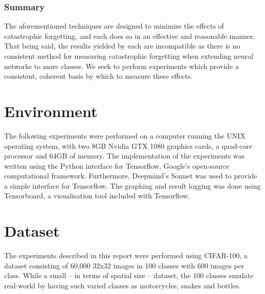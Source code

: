 \documentclass{report}
\begin{document}
	\subsubsection{Summary}
	The aforementioned techniques are designed to minimise the effects of catastrophic forgetting, and each does so in an effective and reasonable manner. That being said, the results yielded by each are incompatible as there is no consistent method for measuring catastrophic forgetting when extending neural networks to more classes. We seek to perform experiments which provide a consistent, coherent basis by which to measure these effects. \par
	

	\section{Environment}
	The following experiments were performed on a computer running the UNIX operating system, with two 8GB Nvidia GTX 1080 graphics cards, a quad-core processor and 64GB of memory. The implementation of the experiments was written using the Python interface for Tensorflow\parencite{tensorflow}, Google's open-source computational framework. Furthermore, Deepmind's Sonnet\parencite{sonnet} was used to provide a simple interface for Tensorflow. The graphing and result logging was done using Tensorboard, a visualisation tool included with Tensorflow. \par
	
	\section{Dataset}
	The experiments described in this report were performed using CIFAR-100\parencite{cifar100}, a dataset consisting of 60,000 32x32 images in 100 classes with 600 images per class. While a small -- in terms of spatial size -- dataset, the 100 classes emulate real-world by having such varied classes as motorcycles, snakes and bottles. \par
	
\end{document}
